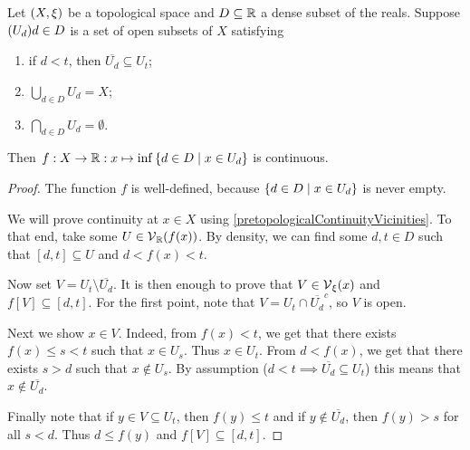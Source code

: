 \begin{lemma} \label{UrysohnsLemmaLemma}
Let $\sSet{X,\xi}$ be a topological space and $D\subseteq \mathbb{R}$ a dense subset of the reals. Suppose $\sSet{U_d}{d\in D}$ is a set of open subsets of $X$ satisfying
\begin{enumerate}
\item if $d < t$, then $\overline{U_d}\subseteq U_t$;
\item $\bigcup_{d\in D}U_d = X$;
\item $\bigcap_{d\in D}U_d = \emptyset$.
\end{enumerate}
Then $f: X\to \R: x\mapsto \inf\setbuilder{d\in D}{x\in U_d}$ is continuous.
\end{lemma}
\begin{proof}
The function $f$ is well-defined, because $\setbuilder{d\in D}{x\in U_d}$ is never empty.

We will prove continuity at $x\in X$ using \ref{pretopologicalContinuityVicinities}. To that end, take some $U\in \operatorname{\mathcal{V}}_{\mathbb{R}}(f(x))$. By density, we can find some $d,t\in D$ such that $[d,t]\subseteq U$ and $d < f(x) < t$.

Now set $V = U_t\setminus\overline{U_d}$. It is then enough to prove that $V\in \operatorname{\mathcal{V}}_\xi(x)$ and $f[V]\subseteq [d,t]$. For the first point, note that $V = U_t\cap\overline{U_d}^c$, so $V$ is open.

Next we show $x\in V$. Indeed, from $f(x) < t$, we get that there exists $f(x) \leq s < t$ such that $x\in U_s$. Thus $x\in U_t$. From $d < f(x)$, we get that there exists $s>d$ such that $x\notin U_s$. By assumption ($d < t \implies \overline{U_d}\subseteq U_t$) this means that $x\notin \overline{U_d}$.

Finally note that if $y\in V \subseteq U_t$, then $f(y) \leq t$ and if $y\notin \overline{U_d}$, then $f(y) > s$ for all $s< d$. Thus $d \leq f(y)$ and $f[V]\subseteq [d,t]$.
\end{proof}

